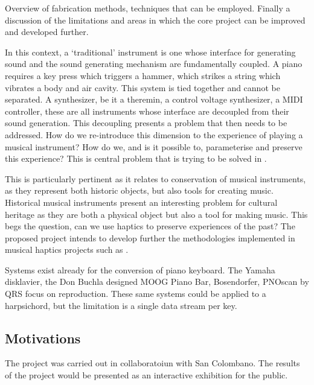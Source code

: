 Overview of fabrication methods, techniques that can be employed.
Finally a discussion of the limitations and areas in which the core
project can be improved and developed further.

In this context, a `traditional' instrument is one whose interface for
generating sound and the sound generating mechanism are fundamentally
coupled. A piano requires a key press which triggers a hammer, which
strikes a string which vibrates a body and air cavity. This system is
tied together and cannot be separated. A synthesizer, be it a theremin,
a control voltage synthesizer, a MIDI controller, these are all
instruments whose interface are decoupled from their sound generation.
This decoupling presents a problem that then needs to be addressed. How
do we re-introduce this dimension to the experience of playing a musical
instrument? How do we, and is it possible to, parameterise and preserve
this experience? This is central problem that is trying to be solved in
\cite{Nichols2002, Timmermans2020, McAlpine2014, Baldwin2016}.

This is particularly pertinent as it relates to conservation of musical
instruments, as they represent both historic objects, but also tools for
creating music. Historical musical instruments present an interesting
problem for cultural heritage as they are both a physical object but
also a tool for making music. This begs the question, can we use haptics
to preserve experiences of the past? The proposed project intends to
develop further the methodologies implemented in musical haptics
projects \cite{MusicalHaptics2018} such as \cite{Timmermans2020}.

Systems exist already for the conversion of piano keyboard. The Yamaha
disklavier, the Don Buchla designed MOOG Piano Bar, Bosendorfer, PNOscan
by QRS focus on reproduction. These same systems could be applied to a
harpsichord, but the limitation is a single data stream per key.

\subsection{Motivations}\label{motivations}

The project was carried out in collaboratoiun with San Colombano. The
results of the project would be presented as an interactive exhibition
for the public.


